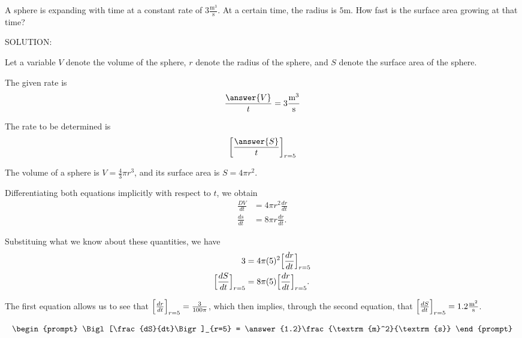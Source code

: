 \documentclass{ximera}
\author{Steven Gubkin\and Nela Lakos}
\begin{document}
\begin{exercise}

A sphere is expanding with time at a constant rate of $3
\frac{\textrm{m}^3}{\textrm{s}}$.  At a certain time, the radius is $5
\textrm{m}$.  How fast is the surface area growing at that time?


SOLUTION:


Let a variable $V$ denote the volume of the sphere, $r$ denote the radius of the sphere, and $S$ denote the surface area of the sphere.

The given rate is
\[
\frac{\answer{V}}{t} =3\frac{\textrm{m}^3}{\textrm{s}}
\]

The rate to be determined is
\[
\left[\frac{\answer{S}}{t}\right]_{r=5} 
\]


\begin{hint}
  The volume of a sphere is $V = \frac{4}{3} \pi r^3$, and its surface area is $S = 4 \pi r^2$.
\end{hint}


\begin{hint}
  Differentiating  both equations implicitly with respect to $t$, we obtain
\begin{align*}
\frac{DV}{dt} &= 4 \pi r^2 \frac{dr}{dt} \\
\frac{ds}{dt} &= 8\pi r \frac{dr}{dt}.
\end{align*}
\end{hint}

\begin{hint}
	Substituing what we know about these quantities, we have
\begin{align*}
3 &= 4 \pi (5)^2 \Bigl[\frac{dr}{dt}\Bigr]_{r=5} \\
\Bigl[\frac{dS}{dt}\Bigr]_{r=5} &= 8\pi (5)\Bigl[\dfrac{dr}{dt}\Bigr]_{r=5}.
\end{align*}
\end{hint}

\begin{hint}
  The first equation allows us to see that $\Bigl[\frac{dr}{dt}\Bigr]_{r=5} =
  \frac{3}{100 \pi}$, which then implies, through the second equation,
  that $\Bigl[\frac{dS}{dt}\Bigr]_{r=5} = 1.2\frac{\textrm{m}^2}{\textrm{s}}$.
\end{hint}


\[
\begin{prompt}
	\Bigl[\frac{dS}{dt}\Bigr]_{r=5}  = \answer{1.2}\frac{\textrm{m}^2}{\textrm{s}}
\end{prompt}
\]

\end{exercise}
\end{document}
